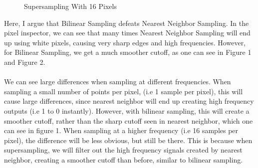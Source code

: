\documentclass{article}
\begin{document}
\begin{figure}[H]
    \centering
    \caption{Supersampling With 16 Pixels}
    \label{ref_label_overall}
\end{figure}
Here, I argue that Bilinear Sampling defeats Nearest Neighbor Sampling. In the pixel inspector, we can see that many times Nearest Neighbor Sampling will end up using white pixels, causing very sharp edges and high frequencies. However, for Bilinear Sampling, we get a much smoother cutoff, as one can see in Figure 1 and Figure 2. 
\\
\\
We can see large differences when sampling at different frequencies. When sampling a small number of points per pixel, (i.e 1 sample per pixel), this will cause large differences, since nearest neighbor will end up creating high frequency outputs (i.e 1 to 0 instantly). However, with bilinear sampling, this will create a smoother cutoff, rather than the sharp cutoff seen in nearest neighbor, which one can see in figure 1. When sampling at a higher frequency (i.e 16 samples per pixel), the difference will be less obvious, but still be there. This is because when supersampling, we will filter out the high frequency signals created by nearest neighbor, creating a smoother cutoff than before, similar to bilinear sampling. 
\end{document}
